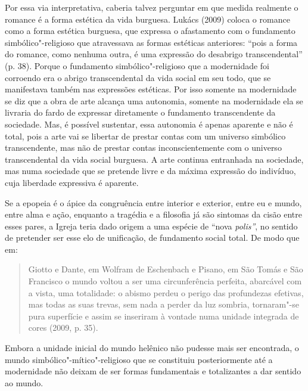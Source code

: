 Por essa via interpretativa, caberia talvez perguntar em que medida
realmente o romance é a forma estética da vida burguesa. Lukács (2009)
coloca o romance como a forma estética burguesa, que expressa o
afastamento com o fundamento simbólico"-religioso que atravessava as
formas estéticas anteriores: ``pois a forma do romance, como nenhuma
outra, é uma expressão do desabrigo transcendental'' (p. 38). Porque o
fundamento simbólico"-religioso que a modernidade foi corroendo era o
abrigo transcendental da vida social em seu todo, que se manifestava
também nas expressões estéticas. Por isso somente na modernidade se diz
que a obra de arte alcança uma autonomia, somente na modernidade ela se
livraria do fardo de expressar diretamente o fundamento transcendente da
sociedade. Mas, é possível sustentar, essa autonomia é apenas aparente e
não é total, pois a arte vai se libertar de prestar contas com um
universo simbólico transcendente, mas não de prestar contas
inconscientemente com o universo transcendental da vida social burguesa.
A arte continua entranhada na sociedade, mas numa sociedade que se
pretende livre e da máxima expressão do indivíduo, cuja liberdade expressiva é aparente.

Se a epopeia é o ápice da congruência entre interior e exterior, entre
eu e mundo, entre alma e ação, enquanto a tragédia e a filosofia já são
sintomas da cisão entre esses pares, a Igreja teria dado origem a uma
espécie de ``nova \emph{polis''}, no sentido de pretender ser esse elo
de unificação, de fundamento social total. De modo que em:

\begin{quote}
Giotto e Dante, em Wolfram de Eschenbach e Pisano, em São Tomás e São
Francisco o mundo voltou a ser uma circunferência perfeita, abarcável
com a vista, uma totalidade: o abismo perdeu o perigo das profundezas
efetivas, mas todas as suas trevas, sem nada a perder da luz sombria,
tornaram"-se pura superfície e assim se inseriram à vontade numa unidade
integrada de cores (2009, p. 35).
\end{quote}

Embora a unidade inicial do mundo helênico não pudesse mais ser
encontrada, o mundo simbólico"-mítico"-religioso que se constituiu
posteriormente até a modernidade não deixam de ser formas fundamentais e
totalizantes a dar sentido ao mundo.


